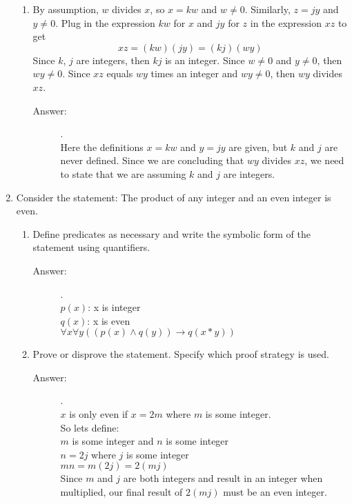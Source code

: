 \documentclass[12pt, oneside]{article}
\begin{document}
\begin{enumerate}
\begin{enumerate}
    \item By assumption, $w$ divides $x$, so $x = kw$ and $w \neq 0$. Similarly, $z = jy$ and $y \neq 0$. Plug in the expression $kw$ for $x$ and $jy$ for $z$ in the expression $xz$ to get
    \[xz=(kw)(jy)=(kj)(wy)\]
    Since $k$, $j$ are integers, then $kj$ is an integer. Since $w \neq 0$ and $y \neq 0$, then $wy \neq 0$. Since $xz$ equals $wy$ times an integer and $wy \neq 0$, then $wy$ divides $xz$.
    \begin{description}
        \item[Answer:].\\
        Here the definitions $x=kw$ and $y=jy$ are given, but $k$ and $j$ are never defined. Since we are concluding that $wy$ divides $xz$, we need to state that we are assuming $k$ and $j$ are integers.
    \end{description}
\end{enumerate}

\quad

\item Consider the statement: The product of any integer and an even integer is even.
\begin{enumerate}
    \item Define predicates as necessary and write the symbolic form of the statement using quantifiers.
    \begin{description}
        \item[Answer:].\\
        $p(x)$: x is integer\\
        $q(x)$: x is even\\  
        $\forall x \forall y ((p(x) \land q(y)) \rightarrow q(x * y))$
    \end{description}
    \item Prove or disprove the statement. Specify which proof strategy is used.
    \begin{description}
        \item[Answer:].\\
        $x$ is only even if $x=2m$ where $m$ is some integer.\\
        So lets define:\\
        $m$ is some integer and $n$ is some integer\\
        $n=2j$ where $j$ is some integer\\
        $mn=m(2j)=2(mj)$\\
        Since $m$ and $j$ are both integers and result in an integer when multiplied, our final result of $2(mj)$ must be an even integer.
    \end{description}
\end{enumerate}




\end{enumerate}
\end{document}
